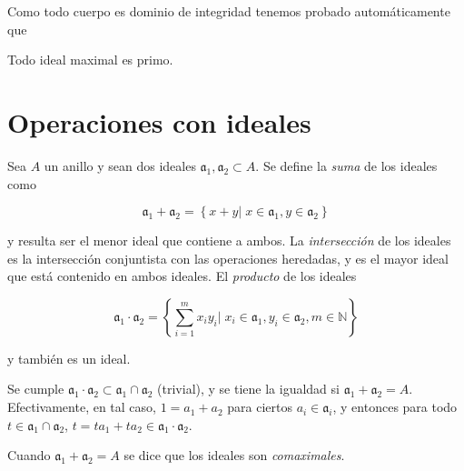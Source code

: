 \documentclass[./main.tex]{subfiles}
\begin{document}
Como todo cuerpo es dominio de integridad tenemos probado automáticamente que

\begin{corollary}
Todo ideal maximal es primo.
\end{corollary}

\section{Operaciones con ideales}
Sea $A$ un anillo y sean dos ideales $\mathfrak a_1, \mathfrak a_2 \subset A$. Se define la \emph{suma} de los ideales como

\[ \mathfrak a_1 + \mathfrak a_2 = \left \{ x+y \big \vert \; x \in \mathfrak a_1, y \in \mathfrak a_2 \right \} \]

y resulta ser el menor ideal que contiene a ambos. La \emph{intersección} de los ideales es la intersección conjuntista con las operaciones heredadas, y es el mayor ideal que está contenido en ambos ideales. El \emph{producto} de los ideales

\[ \mathfrak a_1 \cdot \mathfrak a_2 = \left \{ \sum_{i=1}^m x_iy_i \big \vert \; x_i \in \mathfrak a_1, y_i \in \mathfrak a_2, m\in \mathbb N \right \} \]

y también es un ideal.

\begin{remark}
Se cumple $\mathfrak a_1 \cdot \mathfrak a_2 \subset \mathfrak a_1 \cap \mathfrak a_2$ (trivial), y se tiene la igualdad si $\mathfrak a_1 + \mathfrak a_2 = A$. Efectivamente, en tal caso, $1 = a_1 + a_2$ para ciertos $a_i \in \mathfrak a_i$, y entonces para todo $t\in \mathfrak a_1 \cap \mathfrak a_2$, $t = ta_1 + ta_2 \in \mathfrak a_1 \cdot \mathfrak a_2$.

Cuando $\mathfrak a_1 + \mathfrak a_2 = A$ se dice que los ideales son \emph{comaximales}.
\end{remark}
\end{document}
